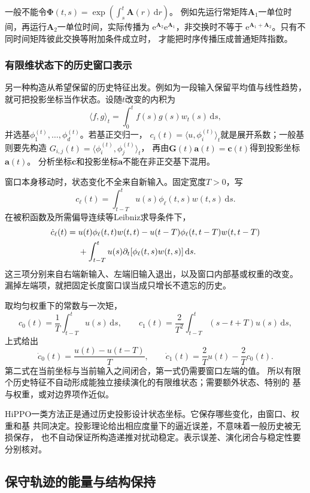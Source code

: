 一般不能令$\bm\Phi(t,s)=\exp(\int_s^t\bm A(r)\,\mathrm dr)$。
例如先运行常矩阵$\bm A_1$一单位时间，再运行$\bm A_2$一单位时间，实际传播为
$\mathrm e^{\bm A_2}\mathrm e^{\bm A_1}$，非交换时不等于
$\mathrm e^{\bm A_1+\bm A_2}$。只有不同时间矩阵彼此交换等附加条件成立时，
才能把时序传播压成普通矩阵指数。

\subsubsection{有限维状态下的历史窗口表示}

另一种构造从希望保留的历史特征出发。例如为一段输入保留平均值与线性趋势，
就可把投影坐标当作状态。设随$t$改变的内积为
\[
  \langle f,g\rangle_t=\int_0^t f(s)g(s)w_t(s)\,\mathrm ds,
\]
并选基$\phi_1^{(t)},\ldots,\phi_d^{(t)}$。若基正交归一，
$c_i(t)=\langle u,\phi_i^{(t)}\rangle_t$就是展开系数；一般基则要先构造
$G_{i,j}(t)=\langle\phi_i^{(t)},\phi_j^{(t)}\rangle_t$，
再由$\bm G(t)\bm a(t)=\bm c(t)$得到投影坐标$\bm a(t)$。
分析坐标$\bm c$和投影坐标$\bm a$不能在非正交基下混用。

窗口本身移动时，状态变化不全来自新输入。固定宽度$T>0$，写
\[
  c_\ell(t)=\int_{t-T}^t u(s)\phi_\ell(t,s)w(t,s)\,\mathrm ds.
\]
在被积函数及所需偏导连续等Leibniz求导条件下，
\begin{align}
  \dot c_\ell(t)
  ={}&u(t)\phi_\ell(t,t)w(t,t)
    -u(t-T)\phi_\ell(t,t-T)w(t,t-T)\notag\\
  &+\int_{t-T}^t u(s)\partial_t[\phi_\ell(t,s)w(t,s)]\,\mathrm ds.
  \label{eq:dynamical-moving-window-coefficient}
\end{align}
这三项分别来自右端新输入、左端旧输入退出，以及窗口内部基或权重的改变。
漏掉左端项，就把固定长度窗口误当成只增长不遗忘的历史。

取均匀权重下的常数与一次矩，
\[
  c_0(t)=\frac1T\int_{t-T}^t u(s)\,\mathrm ds,\qquad
  c_1(t)=\frac2{T^2}\int_{t-T}^t(s-t+T)u(s)\,\mathrm ds,
\]
上式给出
\[
  \dot c_0(t)=\frac{u(t)-u(t-T)}T,\qquad
  \dot c_1(t)=\frac2T u(t)-\frac2T c_0(t).
\]
第二式在当前坐标与当前输入之间闭合，第一式仍需要窗口左端的值。
所以有限个历史特征不自动形成能独立接续演化的有限维状态；需要额外状态、特别的
基与权重，或对边界项作近似。

HiPPO一类方法正是通过历史投影设计状态坐标。它保存哪些变化，由窗口、权重和基
共同决定。投影理论给出相应度量下的逼近误差，不意味着一般历史被无损保存，
也不自动保证所构造递推对扰动稳定。表示误差、演化闭合与稳定性要分别核对。

\subsection{保守轨迹的能量与结构保持}
\label{sec:dynamical-hamiltonian-geometric-integration}


